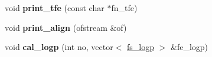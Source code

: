 \begin{DoxyCompactItemize}
\item 
\hypertarget{classmodel12_a1f0c19c6980459cf0b861a64eb6d2337}{void {\bfseries print\-\_\-tfe} (const char $\ast$fn\-\_\-tfe)}\label{classmodel12_a1f0c19c6980459cf0b861a64eb6d2337}

\item 
\hypertarget{classmodel12_ac0ac6228ebfecc5c2dd36abfa6f0ecab}{void {\bfseries print\-\_\-align} (ofstream \&of)}\label{classmodel12_ac0ac6228ebfecc5c2dd36abfa6f0ecab}

\item 
\hypertarget{classmodel12_ac2d1fd58c3a1a74128390cddc6b24eed}{void {\bfseries cal\-\_\-logp} (int no, vector$<$ \hyperlink{classfs__logp}{fs\-\_\-logp} $>$ \&fe\-\_\-logp)}\label{classmodel12_ac2d1fd58c3a1a74128390cddc6b24eed}

\end{DoxyCompactItemize}
